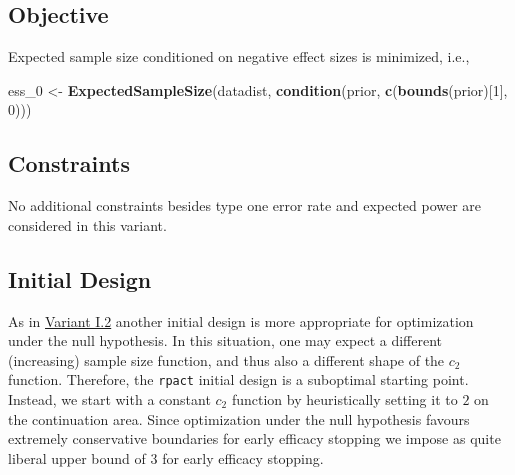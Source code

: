 \documentclass[]{book}
\newenvironment{Shaded}{\begin{snugshade}}{\end{snugshade}}
\newcommand{\DecValTok}[1]{\textcolor[rgb]{0.00,0.00,0.81}{#1}}
\newcommand{\KeywordTok}[1]{\textcolor[rgb]{0.13,0.29,0.53}{\textbf{#1}}}
\newcommand{\NormalTok}[1]{#1}
\newcommand{\StringTok}[1]{\textcolor[rgb]{0.31,0.60,0.02}{#1}}
\begin{document}
\hypertarget{objective-4}{%
\subsection{Objective}\label{objective-4}}

Expected sample size conditioned on negative effect sizes is minimized, i.e.,

\begin{Shaded}
\begin{Highlighting}[]
\NormalTok{ess_}\DecValTok{0}\NormalTok{ <-}\StringTok{ }\KeywordTok{ExpectedSampleSize}\NormalTok{(datadist, }\KeywordTok{condition}\NormalTok{(prior, }\KeywordTok{c}\NormalTok{(}\KeywordTok{bounds}\NormalTok{(prior)[}\DecValTok{1}\NormalTok{], }\DecValTok{0}\NormalTok{)))}
\end{Highlighting}
\end{Shaded}

\hypertarget{constraints-4}{%
\subsection{Constraints}\label{constraints-4}}

No additional constraints besides type one error rate and expected power
are considered in this variant.

\hypertarget{initial-design-3}{%
\subsection{Initial Design}\label{initial-design-3}}

As in \protect\hyperlink{variantI_2}{Variant I.2} another initial design is more appropriate
for optimization under the null hypothesis.
In this situation, one may expect a different (increasing) sample size function,
and thus also a different shape of the \(c_2\) function.
Therefore, the \texttt{rpact} initial design is a suboptimal starting point.
Instead, we start with a constant \(c_2\) function by heuristically
setting it to \(2\) on the continuation area.
Since optimization under the null hypothesis favours extremely conservative
boundaries for early efficacy stopping we impose as quite liberal upper bound
of \(3\) for early efficacy stopping.
\end{document}
